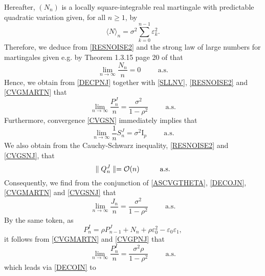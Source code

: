 \documentclass[article,12pt]{amsart}
\numberwithin{equation}{section}
\theoremstyle{plain}
\begin{document}
Hereafter,  $(N_n)$ is a locally square-integrable real martingale with predictable quadratic variation
given, for all $n \geq 1$, by
\begin{equation*}
\langle N \rangle_n=\sigma^2\sum_{k=0}^{n-1} {\varepsilon}_k^2.
\end{equation*}
Therefore, we deduce from \eqref{RESNOISE2} and the strong law of large
numbers for martingales given e.g. by Theorem 1.3.15 page 20 of \cite{Duflo} that
\begin{equation}
\label{CVGMARTN}
\lim_{n\rightarrow \infty} \frac{N_{n}}{n} = 0 \hspace{1cm} \text{a.s.}
\end{equation}
Hence, we obtain from \eqref{DECPNJ} together with \eqref{SLLNV}, \eqref{RESNOISE2} and \eqref{CVGMARTN}
that
\begin{equation}
\label{CVGPNJ}
\lim_{n\rightarrow \infty} \frac{P_{n}^{J}}{n} = \frac{\sigma^2}{1- \rho^2} \hspace{1cm} \text{a.s.}
\end{equation}
Furthermore, convergence \eqref{CVGSN} immediately implies that
\begin{equation}
\label{CVGSNJ}
\lim_{n\rightarrow \infty} \frac{1}{n}S_n^J=\sigma^2 {\mathrm{I}}_p \hspace{1cm} \text{a.s.}
\end{equation}
We also obtain from the Cauchy-Schwarz inequality, \eqref{RESNOISE2} and \eqref{CVGSNJ}, that
$$
\parallel Q_n^{J} \parallel = {\mathcal{O}}(n) \hspace{1cm}\textnormal{a.s.}
$$
Consequently, we find from the conjunction of \eqref{ASCVGTHETA}, \eqref{DECOJN}, \eqref{CVGMARTN}
and \eqref{CVGSNJ} that
\begin{equation}
\label{CVGJN}
\lim_{n\rightarrow \infty} \frac{J_n}{n}= \frac{\sigma^2}{1- \rho^2} \hspace{1cm} \text{a.s.}
\end{equation}
By the same token, as
\begin{equation}
\label{PNIJ}
P_n^{I}=\rho P_{n-1}^{J}  + N_n + \rho {\varepsilon}_0^2 -{\varepsilon}_0 {\varepsilon}_1,
\end{equation}
it follows from \eqref{CVGMARTN} and \eqref{CVGPNJ} that
\begin{equation}
\label{CVGPNI}
\lim_{n\rightarrow \infty} \frac{P_{n}^{I}}{n} = \frac{\sigma^2 \rho}{1- \rho^2} \hspace{1cm} \text{a.s.}
\end{equation}
which leads via \eqref{DECOIN} to
\end{document}
